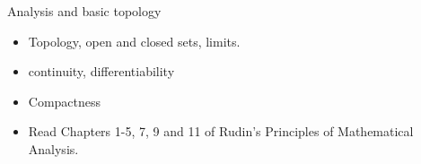 \documentclass[final]{beamer}
\begin{document}
	\begin{frame}{Analysis and basic topology}
		\begin{itemize}
			\item Topology, open and closed sets, limits.
			\pause
			\item continuity, differentiability
			\pause
			\item Compactness
			\pause
			\item Read Chapters 1-5, 7, 9 and 11 of Rudin's Principles of Mathematical Analysis.
		\end{itemize}
	\end{frame}
	
\end{document}
